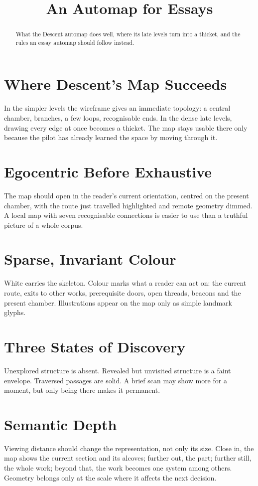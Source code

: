 \documentclass{article}
\title{An Automap for Essays}
\begin{document}
\begin{abstract}
What the Descent automap does well, where its late levels turn into a thicket, and the rules an essay automap should follow instead.
\end{abstract}
\section{Where Descent's Map Succeeds}\label{sec:map-success}
In the simpler levels the wireframe gives an immediate topology: a central chamber, branches, a few loops, recognisable ends. In the dense late levels, drawing every edge at once becomes a thicket. The map stays usable there only because the pilot has already learned the space by moving through it.
\section{Egocentric Before Exhaustive}\label{sec:map-ego}
The map should open in the reader's current orientation, centred on the present chamber, with the route just travelled highlighted and remote geometry dimmed. A local map with seven recognisable connections is easier to use than a truthful picture of a whole corpus.
\section{Sparse, Invariant Colour}\label{sec:map-colour}
White carries the skeleton. Colour marks what a reader can act on: the current route, exits to other works, prerequisite doors, open threads, beacons and the present chamber. Illustrations appear on the map only as simple landmark glyphs.
\section{Three States of Discovery}\label{sec:map-states}
Unexplored structure is absent. Revealed but unvisited structure is a faint envelope. Traversed passages are solid. A brief scan may show more for a moment, but only being there makes it permanent.
\section{Semantic Depth}\label{sec:map-depth}
Viewing distance should change the representation, not only its size. Close in, the map shows the current section and its alcoves; further out, the part; further still, the whole work; beyond that, the work becomes one system among others. Geometry belongs only at the scale where it affects the next decision.
\end{document}
